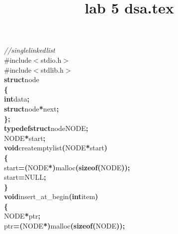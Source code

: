 \documentclass[a4paper, 21pt]{article}
\title{lab 5 dsa.tex}
\newcommand\SPC{\hspace*{0.6em}}
\newcommand\TAB{\hspace*{1.2em}}
\newcommand{\CppAComment}[1]{\textit{\textcolor[rgb]{0,0.47,0.84}{#1}}}
\newcommand{\CppAIdentifier}[1]{#1}
\newcommand{\CppAPreprocessor}[1]{\textcolor[rgb]{0,0.5,0}{#1}}
\newcommand{\CppAReservedWord}[1]{\textbf{#1}}
\newcommand{\CppASpace}[1]{\colorbox[rgb]{1,1,1}{#1}}
\newcommand{\CppASymbol}[1]{\textbf{\textcolor[rgb]{1,0,0}{#1}}}
\begin{document}
\begin{ttfamily}
\noindent
\CppAComment{//single\SPC linked\SPC list}\\
\CppAPreprocessor{\#include$<$stdio.h$>$}\\
\CppAPreprocessor{\#include$<$stdlib.h$>$}\\
\CppAReservedWord{struct}\CppASpace{\SPC }\CppAIdentifier{node}\\
\CppASymbol{\{}\\
\CppASpace{\TAB }\CppAReservedWord{int}\CppASpace{\SPC }\CppAIdentifier{data}\CppASymbol{;}\\
\CppASpace{\TAB }\CppAReservedWord{struct}\CppASpace{\SPC }\CppAIdentifier{node}\CppASymbol{*}\CppAIdentifier{next}\CppASymbol{;}\\
\CppASymbol{\}}\CppASymbol{;}\\
\CppAReservedWord{typedef}\CppASpace{\SPC }\CppAReservedWord{struct}\CppASpace{\SPC }\CppAIdentifier{node}\CppASpace{\SPC }\CppAIdentifier{NODE}\CppASymbol{;}\\
\CppAIdentifier{NODE}\CppASymbol{*}\CppAIdentifier{start}\CppASymbol{;}\\
\CppAReservedWord{void}\CppASpace{\SPC }\CppAIdentifier{createmptylist}\CppASymbol{(}\CppAIdentifier{NODE}\CppASymbol{*}\CppAIdentifier{start}\CppASymbol{)}\\
\CppASymbol{\{}\\
\CppASpace{\TAB }\CppAIdentifier{start}\CppASymbol{=}\CppASymbol{(}\CppAIdentifier{NODE}\CppASymbol{*}\CppASymbol{)}\CppAIdentifier{malloc}\CppASymbol{(}\CppAReservedWord{sizeof}\CppASymbol{(}\CppAIdentifier{NODE}\CppASymbol{)}\CppASymbol{)}\CppASymbol{;}\\
\CppASpace{\TAB }\CppAIdentifier{start}\CppASymbol{=}\CppAIdentifier{NULL}\CppASymbol{;}\\
\CppASymbol{\}}\\
\CppAReservedWord{void}\CppASpace{\SPC }\CppAIdentifier{insert\_at\_begin}\CppASymbol{(}\CppAReservedWord{int}\CppASpace{\SPC }\CppAIdentifier{item}\CppASymbol{)}\\
\CppASymbol{\{}\\
\CppASpace{\TAB }\CppAIdentifier{NODE}\CppASymbol{*}\CppAIdentifier{ptr}\CppASymbol{;}\\
\CppASpace{\TAB }\CppAIdentifier{ptr}\CppASymbol{=}\CppASymbol{(}\CppAIdentifier{NODE}\CppASymbol{*}\CppASymbol{)}\CppAIdentifier{malloc}\CppASymbol{(}\CppAReservedWord{sizeof}\CppASymbol{(}\CppAIdentifier{NODE}\CppASymbol{)}\CppASymbol{)}\CppASymbol{;}\\

\end{ttfamily}
\end{document}
